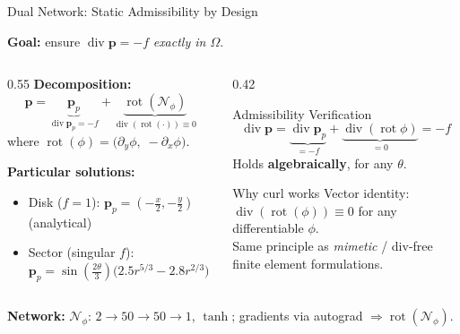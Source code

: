 \documentclass[10pt,aspectratio=169]{beamer}
\DeclareMathOperator{\divg}{div}
\DeclareMathOperator{\rot}{rot}
\begin{document}
\begin{frame}{Dual Network: Static Admissibility by Design}

  \textbf{Goal:} ensure $\divg\mathbf{p} = -f$ \emph{exactly in $\Omega$}.

  \begin{columns}[T]
    \begin{column}{0.55\textwidth}
      \textbf{Decomposition:}
      \[
        \mathbf{p} = \underbrace{\mathbf{p}_p}_{\divg\mathbf{p}_p = -f}
                   + \underbrace{\rot(\mathcal{N}_\phi)}_{\divg(\rot(\cdot))\equiv 0}
      \]
      where $\rot(\phi) = \bigl(\partial_y\phi,\;-\partial_x\phi\bigr)$.

      \bigskip
      \textbf{Particular solutions:}
      \begin{itemize}
        \item Disk ($f=1$):
              $\mathbf{p}_p = (-\tfrac{x}{2}, -\tfrac{y}{2})$ \;(analytical)
        \item Sector (singular $f$):
              $\mathbf{p}_p = \sin(\tfrac{2\theta}{3})\bigl(2.5r^{5/3} - 2.8r^{2/3}\bigr)
              (\cos\theta, \sin\theta)$
      \end{itemize}
    \end{column}
    \begin{column}{0.42\textwidth}
      \begin{block}{Admissibility Verification}
        \[
          \divg\mathbf{p} = \underbrace{\divg\mathbf{p}_p}_{=-f}
                          + \underbrace{\divg(\rot\phi)}_{=0} = -f
        \]
        Holds \textbf{algebraically}, for any $\theta$.
      \end{block}
      \medskip
      \begin{block}{Why curl works}
        Vector identity: $\divg(\rot(\phi)) \equiv 0$
        for any differentiable $\phi$.
        \\[4pt]
        Same principle as \emph{mimetic} / div-free
        finite element formulations.
      \end{block}
    \end{column}
  \end{columns}

  \bigskip
  \textbf{Network:} $\mathcal{N}_\phi$: $2\!\to\!50\!\to\!50\!\to\!1$, $\tanh$;
  gradients via autograd $\Rightarrow \rot(\mathcal{N}_\phi)$.
\end{frame}
\end{document}
